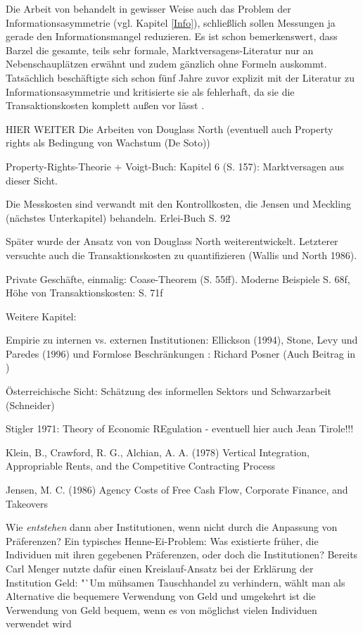 Die Arbeit von \Textcite{Barzel1982} behandelt in gewisser Weise auch das Problem der Informationsasymmetrie (vgl. Kapitel \ref{Info}), schließlich sollen Messungen ja gerade den Informationsmangel reduzieren. Es ist schon bemerkenswert, dass Barzel die gesamte, teils sehr formale, Marktversagens-Literatur nur an Nebenschauplätzen erwähnt und zudem gänzlich ohne Formeln auskommt. Tatsächlich beschäftigte sich \textcite{Barzel1977} schon fünf Jahre zuvor explizit mit der Literatur zu Informationsasymmetrie und kritisierte sie als fehlerhaft, da sie die Transaktionskosten komplett außen vor lässt \parencite[S. 6]{Allen2024}. 


HIER WEITER
Die Arbeiten von Douglass North (eventuell auch Property rights als Bedingung von Wachstum (De Soto))



\parencite[S. 284]{Erlei2016}
Property-Rights-Theorie + Voigt-Buch: Kapitel 6 (S. 157): Marktversagen aus dieser Sicht.


Die Messkosten sind verwandt mit den Kontrollkosten, die Jensen und Meckling (nächstes Unterkapitel) behandeln.
Erlei-Buch S. 92

Später wurde der Ansatz von von Douglass North weiterentwickelt. Letzterer versuchte auch die Transaktionskosten zu quantifizieren (Wallis und North 1986).






Private Geschäfte, einmalig: Coase-Theorem (S. 55ff). Moderne Beispiele S. 68f, Höhe von Transaktionskosten: S. 71f


Weitere Kapitel: 

Empirie zu internen vs. externen Institutionen: Ellickson (1994), Stone, Levy und Paredes (1996) und Formlose Beschränkungen \parencite[S. 43]{North1990}: Richard Posner (Auch Beitrag in \textcite{Warsh})

Österreichische Sicht: Schätzung des informellen Sektors und Schwarzarbeit (Schneider)

Stigler 1971: Theory of Economic REgulation - eventuell hier auch Jean Tirole!!!


Klein, B., Crawford, R. G., Alchian, A. A. (1978) Vertical Integration, Appropriable Rents, and the Competitive Contracting Process

Jensen, M. C. (1986) Agency Costs of Free Cash Flow, Corporate Finance, and Takeovers


Wie \textit{entstehen} dann aber Institutionen, wenn nicht durch die Anpassung von Präferenzen? Ein typisches Henne-Ei-Problem: Was existierte früher, die Individuen mit ihren gegebenen Präferenzen, oder doch die Institutionen? Bereits Carl Menger nutzte dafür einen Kreislauf-Ansatz bei der Erklärung der Institution Geld: "`Um mühsamen Tauschhandel zu verhindern, wählt man als Alternative die bequemere Verwendung von Geld und umgekehrt ist die Verwendung von Geld bequem, wenn es von möglichst vielen Individuen verwendet wird \parencite[S.176]{Hodgson1998}



